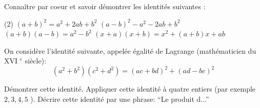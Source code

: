 \documentclass[a4paper,12pt]{report}
\begin{document}
\vspace*{-2\baselineskip}
\begin{acti}
Connaître par coeur et savoir démontrer les identités suivantes :
\begin{tasks}(2)
\task $(a+b)^2=a^2+2 a b+b^2$
\task $(a-b)^2-a^2-2 a b+b^2$
\task $(a+b)(a-b)=a^2-b^2$
\task $(x+a)(x+b)=x^2+(a+b) x+a b$
\end{tasks}
\end{acti}
\begin{acti}	
On considère l'identité suivante, appelée égalité de Lagrange (mathématicien du XVI ${ }^e$ siècle):
\[
\left(a^2+b^2\right)\left(c^2+d^2\right)=(a c+b d)^2+(a d-b c)^2
\]
\begin{tasks}
\task Démontrer cette identité.
\task Appliquer cette identité à quatre entiers (par exemple $2,3,4,5$ ).
\task Décrire cette identité par une phrase: \enquote{Le produit d...}
\end{tasks}
\end{acti}
\end{document}
